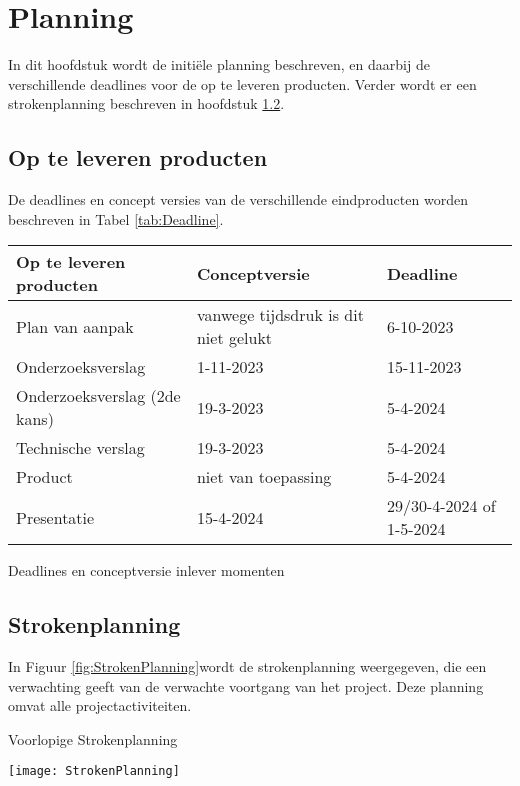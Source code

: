 \chapter{Planning}
In dit hoofdstuk wordt de initiële planning beschreven, en daarbij de verschillende deadlines voor de op te leveren producten.
Verder wordt er een strokenplanning beschreven in hoofdstuk \ref{sec:strokenplanning}.
\section{Op te leveren producten}
De deadlines en concept versies van de verschillende eindproducten worden beschreven in Tabel \ref{tab:Deadline}.
\begin{graphic}
	\captionsetup{type=table}
	\begin{tabularx}{\textwidth}{|l|l|X|}
		\hline
		\textbf{Op te leveren producten} & \textbf{Conceptversie}               & \textbf{Deadline}         \\
		\hline
		Plan van aanpak                  & vanwege tijdsdruk is dit niet gelukt & 6-10-2023                 \\
		\hline
		Onderzoeksverslag                & 1-11-2023                            & 15-11-2023                \\
		\hline
		Onderzoeksverslag (2de kans)     & 19-3-2023                            & 5-4-2024                  \\
		\hline
		Technische verslag                & 19-3-2023                            & 5-4-2024                  \\
		\hline
		Product                          & niet van toepassing                  & 5-4-2024                  \\
		\hline
		Presentatie                      & 15-4-2024                            & 29/30-4-2024 of 1-5-2024 \\
		\hline
	\end{tabularx}
	\caption{Deadlines en conceptversie inlever momenten}
	\label{tab:Deadline}
\end{graphic}
\section{Strokenplanning}
\label{sec:strokenplanning}
In Figuur \ref{fig:StrokenPlanning}wordt de strokenplanning weergegeven, die een verwachting geeft van de verwachte voortgang van het project.
Deze planning omvat alle projectactiviteiten.
\begin{graphic}
	\captionsetup{type=figure}
	\caption{Voorlopige Strokenplanning}
	\texttt{[image: StrokenPlanning]}
	\label{fig:StrokenPlanning}
\end{graphic}
